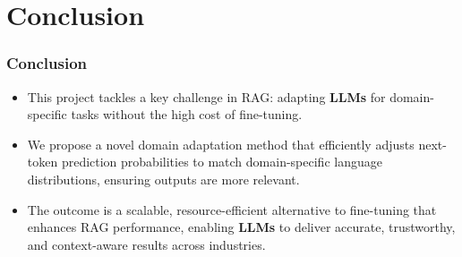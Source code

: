 
\section{Conclusion}

\begin{frame}
\frametitle{Conclusion}

\begin{itemize}
    \item This project tackles a key challenge in RAG: adapting \textbf{LLMs} for domain-specific tasks without the high cost of fine-tuning.
    
    \vspace{0.3cm}
    
    \item We propose a novel domain adaptation method that efficiently adjusts next-token prediction probabilities to match domain-specific language distributions, ensuring outputs are more relevant.
    \vspace{0.3 cm}
    
    \item The outcome is a scalable, resource-efficient alternative to fine-tuning that enhances RAG performance, enabling \textbf{LLMs} to deliver accurate, trustworthy, and context-aware results across industries.

\end{itemize}

\end{frame}
